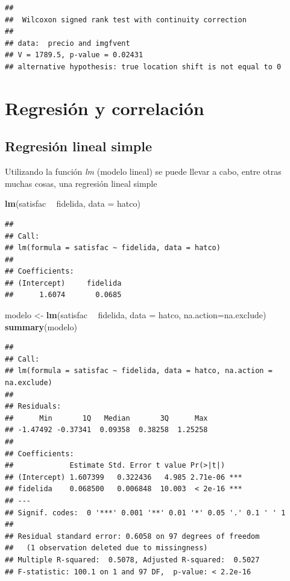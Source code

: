 \documentclass[]{book}
\newenvironment{Shaded}{\begin{snugshade}}{\end{snugshade}}
\newcommand{\KeywordTok}[1]{\textcolor[rgb]{0.13,0.29,0.53}{\textbf{#1}}}
\newcommand{\DataTypeTok}[1]{\textcolor[rgb]{0.13,0.29,0.53}{#1}}
\newcommand{\StringTok}[1]{\textcolor[rgb]{0.31,0.60,0.02}{#1}}
\newcommand{\OperatorTok}[1]{\textcolor[rgb]{0.81,0.36,0.00}{\textbf{#1}}}
\newcommand{\NormalTok}[1]{#1}
\begin{document}
\begin{verbatim}
## 
##  Wilcoxon signed rank test with continuity correction
## 
## data:  precio and imgfvent
## V = 1789.5, p-value = 0.02431
## alternative hypothesis: true location shift is not equal to 0
\end{verbatim}

\section{Regresión y correlación}\label{regresion-y-correlacion}

\subsection{Regresión lineal simple}\label{regresion-lineal-simple}

Utilizando la función \emph{lm} (modelo lineal) se puede llevar a cabo,
entre otras muchas cosas, una regresión lineal simple

\begin{Shaded}
\begin{Highlighting}[]
\KeywordTok{lm}\NormalTok{(satisfac }\OperatorTok{~}\StringTok{ }\NormalTok{fidelida, }\DataTypeTok{data =}\NormalTok{ hatco)}
\end{Highlighting}
\end{Shaded}

\begin{verbatim}
## 
## Call:
## lm(formula = satisfac ~ fidelida, data = hatco)
## 
## Coefficients:
## (Intercept)     fidelida  
##      1.6074       0.0685
\end{verbatim}

\begin{Shaded}
\begin{Highlighting}[]
\NormalTok{modelo <-}\StringTok{ }\KeywordTok{lm}\NormalTok{(satisfac }\OperatorTok{~}\StringTok{ }\NormalTok{fidelida, }\DataTypeTok{data =}\NormalTok{ hatco, }\DataTypeTok{na.action=}\NormalTok{na.exclude)}
\KeywordTok{summary}\NormalTok{(modelo)}
\end{Highlighting}
\end{Shaded}

\begin{verbatim}
## 
## Call:
## lm(formula = satisfac ~ fidelida, data = hatco, na.action = na.exclude)
## 
## Residuals:
##      Min       1Q   Median       3Q      Max 
## -1.47492 -0.37341  0.09358  0.38258  1.25258 
## 
## Coefficients:
##             Estimate Std. Error t value Pr(>|t|)    
## (Intercept) 1.607399   0.322436   4.985 2.71e-06 ***
## fidelida    0.068500   0.006848  10.003  < 2e-16 ***
## ---
## Signif. codes:  0 '***' 0.001 '**' 0.01 '*' 0.05 '.' 0.1 ' ' 1
## 
## Residual standard error: 0.6058 on 97 degrees of freedom
##   (1 observation deleted due to missingness)
## Multiple R-squared:  0.5078, Adjusted R-squared:  0.5027 
## F-statistic: 100.1 on 1 and 97 DF,  p-value: < 2.2e-16
\end{verbatim}
\end{document}
